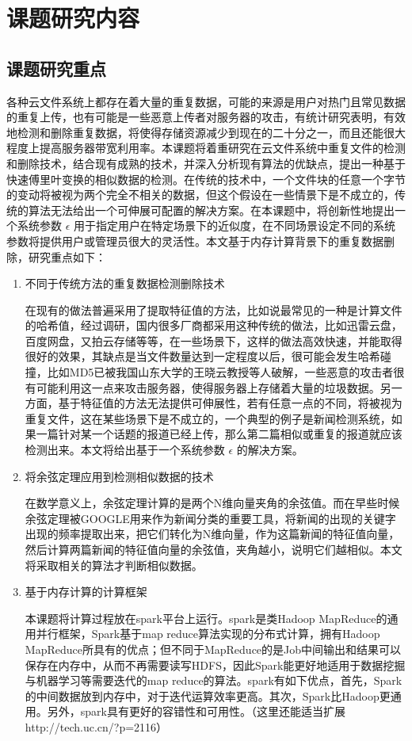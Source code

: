 \section{课题研究内容}
\subsection{课题研究重点}
\label{sec:point1}
各种云文件系统上都存在着大量的重复数据，可能的来源是用户对热门且常见数据的重复上传，也有可能是一些恶意上传者对服务器的攻击，有统计研究表明，有效地检测和删除重复数据，将使得存储资源减少到现在的二十分之一，而且还能很大程度上提高服务器带宽利用率。本课题将着重研究在云文件系统中重复文件的检测和删除技术，结合现有成熟的技术，并深入分析现有算法的优缺点，提出一种基于快速傅里叶变换的相似数据的检测。在传统的技术中，一个文件块的任意一个字节的变动将被视为两个完全不相关的数据，但这个假设在一些情景下是不成立的，传统的算法无法给出一个可伸展可配置的解决方案。在本课题中，将创新性地提出一个系统参数 $\epsilon$ 用于指定用户在特定场景下的近似度，在不同场景设定不同的系统参数将提供用户或管理员很大的灵活性。本文基于内存计算背景下的重复数据删除，研究重点如下：

\begin{enumerate}
\item 不同于传统方法的重复数据检测删除技术

在现有的做法普遍采用了提取特征值的方法，比如说最常见的一种是计算文件的哈希值，经过调研，国内很多厂商都采用这种传统的做法，比如迅雷云盘，百度网盘，又拍云存储等等，在一些场景下，这样的做法高效快速，并能取得很好的效果，其缺点是当文件数量达到一定程度以后，很可能会发生哈希碰撞，比如MD5已被我国山东大学的王晓云教授等人破解，一些恶意的攻击者很有可能利用这一点来攻击服务器，使得服务器上存储着大量的垃圾数据。另一方面，基于特征值的方法无法提供可伸展性，若有任意一点的不同，将被视为重复文件，这在某些场景下是不成立的，一个典型的例子是新闻检测系统，如果一篇针对某一个话题的报道已经上传，那么第二篇相似或重复的报道就应该检测出来。本文将给出基于一个系统参数 $\epsilon$ 的解决方案。

\item 将余弦定理应用到检测相似数据的技术

在数学意义上，余弦定理计算的是两个N维向量夹角的余弦值。而在早些时候余弦定理被GOOGLE用来作为新闻分类的重要工具，将新闻的出现的关键字出现的频率提取出来，把它们转化为N维向量，作为这篇新闻的特征值向量，然后计算两篇新闻的特征值向量的余弦值，夹角越小，说明它们越相似。本文将采取相关的算法才判断相似数据。

\item 基于内存计算的计算框架

本课题将计算过程放在spark平台上运行。spark是类Hadoop MapReduce的通用并行框架，Spark基于map reduce算法实现的分布式计算，拥有Hadoop MapReduce所具有的优点；但不同于MapReduce的是Job中间输出和结果可以保存在内存中，从而不再需要读写HDFS，因此Spark能更好地适用于数据挖掘与机器学习等需要迭代的map reduce的算法。spark有如下优点，首先，Spark的中间数据放到内存中，对于迭代运算效率更高。其次，Spark比Hadoop更通用。另外，spark具有更好的容错性和可用性。（这里还能适当扩展http://tech.uc.cn/?p=2116）

\end{enumerate}

